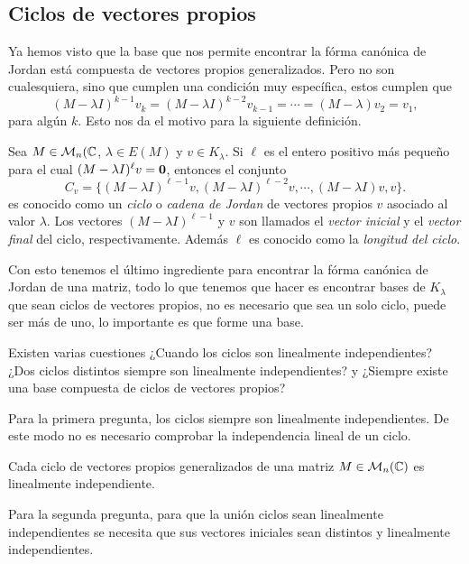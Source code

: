 \subsection{Ciclos de vectores propios}

Ya hemos visto que la base que nos permite encontrar la fórma canónica de Jordan está compuesta de vectores propios generalizados. Pero no son cualesquiera, sino que cumplen una condición muy específica, estos cumplen que 
\[
  (M-\lambda I)^{k-1}v_k = (M-\lambda I)^{k-2}v_{k-1} = \cdots = (M-\lambda)v_2 = v_1,
\]
para algún $k$. Esto nos da el motivo para la siguiente definición.

\begin{defi}
  Sea $M \in \mathcal{M}_n(\mathbb{C}$, $\lambda \in E(M)$ y $v \in K_\lambda$. Si $\ell$ es el entero positivo más pequeño para el cual $(M-\lambda I)^\ell v = \mathbf{0}$, entonces el conjunto
    \[
      C_v = \{ (M-\lambda I)^{\ell-1}v, (M-\lambda I)^{\ell-2}v, \cdots, (M-\lambda I)v, v \}.
    \]
  es conocido como un \emph{ciclo} o \emph{cadena de Jordan} de vectores propios  $v$ asociado al valor $\lambda$.  Los vectores $(M-\lambda I)^{\ell-1}$ y $v$ son llamados el \emph{vector inicial} y el \emph{vector final} del ciclo, respectivamente. Además $\ell$ es conocido como la \emph{longitud del ciclo}.
\end{defi}

Con esto tenemos el último ingrediente para encontrar la fórma canónica de Jordan de una matriz, todo lo que tenemos que hacer es encontrar bases de $K_\lambda$ que sean ciclos de vectores propios, no es necesario que sea un solo ciclo, puede ser más de uno, lo importante es que forme una base.

Existen varias cuestiones ¿Cuando los ciclos son linealmente independientes? ¿Dos ciclos distintos siempre son linealmente independientes? y ¿Siempre existe una base compuesta de ciclos de vectores propios? 

Para la primera pregunta, los ciclos siempre son linealmente independientes. De este modo no es necesario comprobar la independencia lineal de un ciclo.

\begin{teor}
  Cada ciclo de vectores propios generalizados de una matriz $M\in\mathcal{M}_n(\mathbb{C})$ es linealmente independiente.
\end{teor}

Para la segunda pregunta, para que la unión ciclos sean linealmente independientes se necesita que sus vectores iniciales sean distintos y linealmente independientes.

